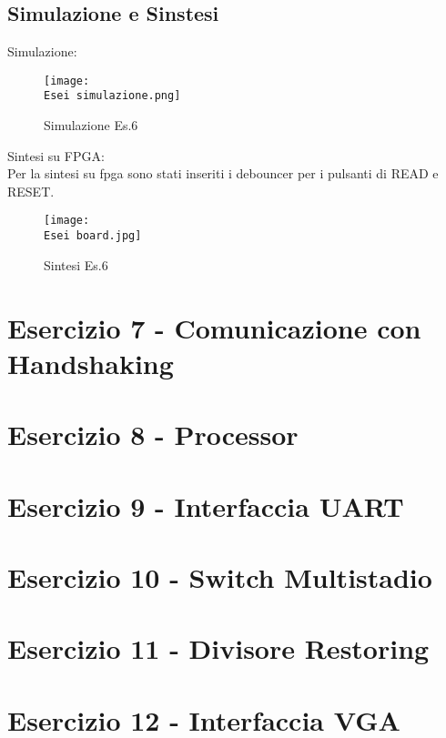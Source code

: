 \documentclass[12pt]{article}
\def \Esei {Allegati/Esercizio6/}
\begin{document}
\subsection{Simulazione e Sinstesi}
Simulazione:
\begin{figure}[ht!]
    \centering
    \texttt{[image: \\Esei simulazione.png]}
    \caption{Simulazione Es.6}
\end{figure}
\clearpage
Sintesi su FPGA:
\\Per la sintesi su fpga sono stati inseriti i debouncer per i pulsanti di READ e RESET.
\begin{figure}[ht!]
    \texttt{[image: \\Esei board.jpg]}
    \caption{Sintesi Es.6}
\end{figure}
\clearpage
\section{Esercizio 7 - Comunicazione con Handshaking}
\newpage
\section{Esercizio 8 - Processor}
\newpage
\section{Esercizio 9 - Interfaccia UART}
\newpage
\section{Esercizio 10 - Switch Multistadio}
\newpage
\section{Esercizio 11 - Divisore Restoring}
\newpage
\section{Esercizio 12 - Interfaccia VGA}

\newpage
\listoffigures
\end{document}
